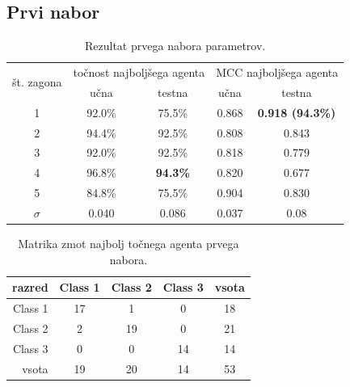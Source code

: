 \subsection{Prvi nabor}\label{subsec:dodatek-wine-prvi-nabor}
\begin{table}[H]
    \begin{center}
        \begin{tabular}{|| c | c c || c c ||}
            \hline
            \multirow{2}{*}{št. zagona} & \multicolumn{2}{c||}{točnost najboljšega agenta} & \multicolumn{2}{c||}{MCC najboljšega agenta} \\ \cline{2-5}
            & učna   & testna          & učna  & testna                  \\
            \hline
            1        & 92.0\% & 75.5\%          & 0.868 & \textbf{0.918 (94.3\%)} \\
            \hline
            2        & 94.4\% & 92.5\%          & 0.808 & 0.843                   \\
            \hline
            3        & 92.0\% & 92.5\%          & 0.818 & 0.779                   \\
            \hline
            4        & 96.8\% & \textbf{94.3\%} & 0.820 & 0.677                   \\
            \hline
            5        & 84.8\% & 75.5\%          & 0.904 & 0.830                   \\
            \hline
            $\sigma$ & 0.040  & 0.086           & 0.037 & 0.08                    \\
            \hline
        \end{tabular}
    \end{center}
    \caption{Rezultat prvega nabora parametrov.}
    \label{tab:wine_result_1}
\end{table}

\begin{table}[H]
    \centering
    \begin{tabular}{||rcccc||}
        \hline
        razred  & Class 1 & Class 2 & Class 3 & vsota \\ \hline
        Class 1 & 17      & 1       & 0       & 18    \\ \hline
        Class 2 & 2       & 19      & 0       & 21    \\ \hline
        Class 3 & 0       & 0       & 14      & 14    \\ \hline
        vsota   & 19      & 20      & 14      & 53    \\ \hline
    \end{tabular}
    \caption{Matrika zmot najbolj točnega agenta prvega nabora.}
    \label{tab:wine_acc_1}
\end{table}

